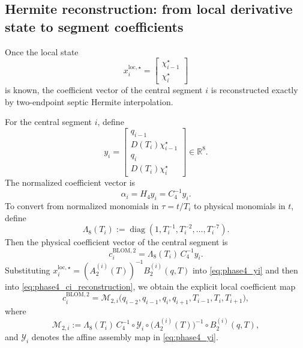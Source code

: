 \subsection{Hermite reconstruction: from local derivative state to segment coefficients}
\label{subsec:phase4_hermite_reconstruction}

Once the local state
\[
x_i^{\mathrm{loc},\star}
=
\begin{bmatrix}
\chi_{i-1}^\star\\ \chi_i^\star
\end{bmatrix}
\]
is known, the coefficient vector of the central segment \(i\) is reconstructed exactly by two-endpoint septic Hermite interpolation.

For the central segment \(i\), define
\begin{equation}
\label{eq:phase4_yi}
y_i
=
\begin{bmatrix}
q_{i-1}\\ D(T_i)\chi_{i-1}^\star\\ q_i\\ D(T_i)\chi_i^\star
\end{bmatrix}
\in\mathbb R^8.
\end{equation}
The normalized coefficient vector is
\begin{equation}
\label{eq:phase4_alpha_i}
\alpha_i = H_4 y_i = C_4^{-1}y_i.
\end{equation}
To convert from normalized monomials in \(\tau=t/T_i\) to physical monomials in \(t\), define
\begin{equation}
\label{eq:phase4_lambda8}
\Lambda_8(T_i):=\operatorname{diag}(1,T_i^{-1},T_i^{-2},\dots,T_i^{-7}).
\end{equation}
Then the physical coefficient vector of the central segment is
\begin{equation}
\label{eq:phase4_ci_reconstruction}
c_i^{\mathrm{BLOM},2}
=
\Lambda_8(T_i)\,C_4^{-1}y_i.
\end{equation}
Substituting \(x_i^{\mathrm{loc},\star}=(A_2^{(i)}(T))^{-1}B_2^{(i)}(q,T)\) into \eqref{eq:phase4_yi} and then into \eqref{eq:phase4_ci_reconstruction}, we obtain the explicit local coefficient map
\begin{equation}
\label{eq:phase4_exact_local_map}
\boxed{
c_i^{\mathrm{BLOM},2}
=
\mathcal M_{2,i}\bigl(q_{i-2},q_{i-1},q_i,q_{i+1},T_{i-1},T_i,T_{i+1}\bigr),
}
\end{equation}
where
\[
\mathcal M_{2,i}
:=
\Lambda_8(T_i)\,C_4^{-1}
\circ
\mathcal Y_i
\circ
\bigl(A_2^{(i)}(T)\bigr)^{-1}
\circ
B_2^{(i)}(q,T),
\]
and \(\mathcal Y_i\) denotes the affine assembly map in \eqref{eq:phase4_yi}.

